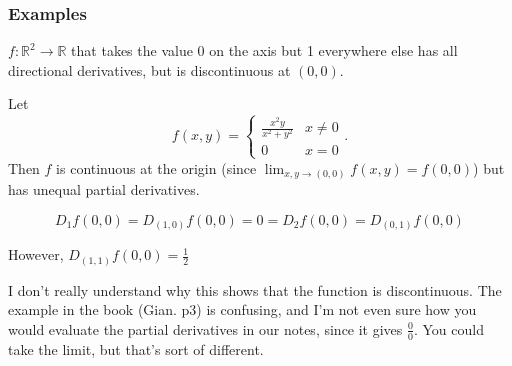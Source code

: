 \documentclass[12pt]{article}
\newcommand{\R}{\mathbb{R}}
\theoremstyle{definition}
\theoremstyle{remark}
\newenvironment{question}[2][QUESTION]{\begin{trivlist}
\item[\hskip \labelsep {\bfseries #1}\hskip \labelsep {\bfseries #2.}]}{\end{trivlist}}
\begin{document}
\subsubsection{Examples}
\begin{enumerate}
    \item $f:\R^2\to\R$ that takes the value $0$ on the axis but 1 everywhere else has all directional derivatives, but is discontinuous at $(0,0)$.
    \item Let \[ f(x,y)= \begin{cases} 
      \frac{x^2y}{x^2+y^2} & x\not = 0\\
      0 & x=0 
   \end{cases}.
\] Then $f$ is continuous at the origin (since $\lim_{x,y\to(0,0)}f(x,y)=f(0,0)$) but has unequal partial derivatives.

$$D_1f(0,0)=D_{(1,0)}f(0,0)=0=D_2f(0,0)=D_{(0,1)}f(0,0)$$

However, $D_{(1,1)}f(0,0)=\frac{1}{2}$
\begin{question}{1}
I don't really understand why this shows that the function is discontinuous. The example in the book (Gian. p3) is confusing, and I'm not even sure how you would evaluate the partial derivatives in our notes, since it gives $\frac{0}{0}$. You could take the limit, but that's sort of different.
\vspace{2in}
\end{question}
\end{enumerate}
\end{document}
